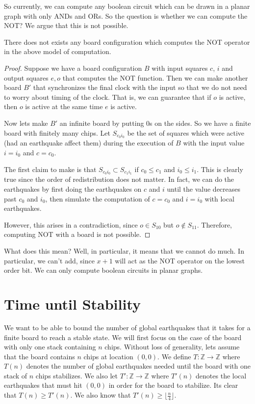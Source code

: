 \documentclass[runningheads,a4paper]{llncs}
\begin{document}
So currently, we can compute any boolean circuit which can be drawn in a planar graph with only ANDs and ORs. So the question is whether we can compute the NOT? We argue that this is not possible. 

\begin{theorem}
There does not exists any board configuration which computes the NOT operator in the above model of computation.
\end{theorem}

\begin{proof}
Suppose we have a board configuration $B$ with input squares $c$, $i$ and output squares $e, o$ that computes the NOT function. Then we can make another board $B'$ that synchronizes the final clock with the input so that we do not need to worry about timing of the clock. That is, we can guarantee that if $o$ is active, then $o$ is active at the same time $e$ is active.

Now lets make $B'$ an infinite board by putting 0s on the sides. So we have a finite board with finitely many chips. Let $S_{c_0i_0}$ be the set of squares which were active (had an earthquake affect them) during the execution of $B$ with the input value $i = i_0$ and $c = c_0$. 

The first claim to make is that $S_{c_0i_0} \subset S_{c_1i_1}$ if $c_0 \leq c_1$ and $i_0 \leq i_1$. This is clearly true since the order of redistribution does not matter. In fact, we can do the earthquakes by first doing the earthquakes on $c$ and $i$ until the value decreases past $c_0$ and $i_0$, then simulate the computation of $c = c_0$ and $i = i_0$ with local earthquakes.

However, this arises in a contradiction, since $o \in S_{10}$ but $o \notin S_{11}$. Therefore, computing NOT with a board is not possible.
\end{proof}

What does this mean? Well, in particular, it means that we cannot do much. In particular, we can't add, since $x + 1$ will act as the NOT operator on the lowest order bit. We can only compute boolean circuits in planar graphs. 

\section{Time until Stability}
\label{Time until Stability}

We want to be able to bound the number of global earthquakes that it takes for a finite board to reach a stable state. We will first focus on the case of the board with only one stack containing $n$ chips. Without loss of generality, lets assume that the board contains $n$ chips at location $(0,0)$. We define $T: \mathbb{Z} \rightarrow \mathbb{Z}$ where $T(n)$ denotes the number of global earthquakes needed until the board with one stack of $n$ chips stabilizes. We also let $T':\mathbb{Z} \rightarrow \mathbb{Z}$ where $T'(n)$ denotes the local earthquakes that must hit $(0,0)$ in order for the board to stabilize. Its clear that $T(n) \geq T'(n)$. We also know that $T'(n) \geq \lfloor \frac{n}{4}\rfloor$. 
\end{document}
